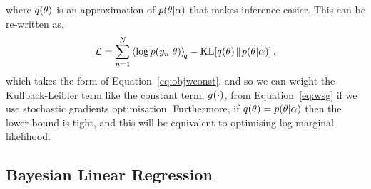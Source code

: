 \documentclass[11pt, oneside]{article}
\begin{document}
where $q\!\left({\theta}\right)$ is an approximation of $p\!\left({\theta}\middle\vert{\ensuremath{\alpha}}\right)$ that 
makes inference easier. This can be re-written as,
\begin{equation}
    \elbo = \sum^N_{n=1} \expec{q}{\log\probC{\targs_n}{\param}} -
    \KL{\qrob{\param}}{\probC{\param}{\hyper}},
    \label{eq:elbo}
\end{equation}
which takes the form of Equation~\eqref{eq:objwconst}, and so we can weight the
Kullback-Leibler term like the constant term, ${g}_{}\!\left({{\cdot}}\right)$, from
Equation~\eqref{eq:wsg} if we use stochastic gradients optimisation.
Furthermore, if $q\!\left({\theta}\right) = p\!\left({\theta}\middle\vert{\ensuremath{\alpha}}\right)$ then the lower bound
is tight, and this will be equivalent to optimising log-marginal likelihood.


\subsection{Bayesian Linear Regression}
\end{document}
